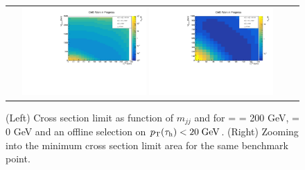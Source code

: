 \begin{figure}[tbh!]
	\centering
	\begin{tabular}{cc}
		\includegraphics[width=0.45\textwidth]{analysis/pics/JetInvMass_vs_MET_xsec_chi200_lsp000_taupt20.pdf}
		\includegraphics[width=0.45\textwidth]{analysis/pics/JetInvMass_vs_MET_xsec_chi200_lsp000_taupt20_zoom.pdf} 		
	\end{tabular}
	\caption{(Left) Cross section limit as function of $m_{jj}$ and \met for \charginopm = \neutralinotwo = 200 GeV, \neutralinoone = 0 GeV and an offline selection on $p_{\text{T}}(\tau_{\text{h}}) <  20\;\text{Ge}\kern-0.06667em\text{V}$. (Right) Zooming into the minimum cross section limit area for the same benchmark point.}
	\label{fig::JetInvMass_vs_MET_xsec_chi200_lsp000_taupt20}
\end{figure}

